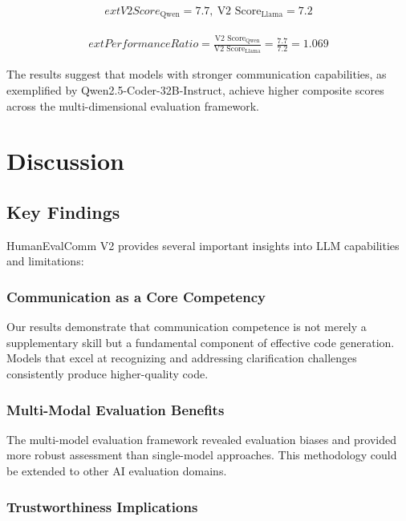 \documentclass[conference]{IEEEtran}
\begin{document}
\begin{align}
        ext{V2 Score}_{\text{Qwen}} = 7.7,\ \text{V2 Score}_{\text{Llama}} = 7.2
\end{align}

\begin{align}
        ext{Performance Ratio} = \frac{\text{V2 Score}_{\text{Qwen}}}{\text{V2 Score}_{\text{Llama}}} = \frac{7.7}{7.2} = 1.069
\end{align}

The results suggest that models with stronger communication capabilities, as exemplified by Qwen2.5-Coder-32B-Instruct, achieve higher composite scores across the multi-dimensional evaluation framework.

\section{Discussion}

\subsection{Key Findings}

HumanEvalComm V2 provides several important insights into LLM capabilities and limitations:

\subsubsection{Communication as a Core Competency}

Our results demonstrate that communication competence is not merely a supplementary skill but a fundamental component of effective code generation. Models that excel at recognizing and addressing clarification challenges consistently produce higher-quality code.

\subsubsection{Multi-Modal Evaluation Benefits}

The multi-model evaluation framework revealed evaluation biases and provided more robust assessment than single-model approaches. This methodology could be extended to other AI evaluation domains.

\subsubsection{Trustworthiness Implications}
\end{document}
